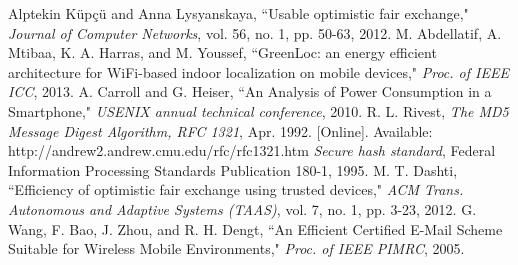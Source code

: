 \documentclass[journal,12pt, onecolumn]{IEEEtran}
\begin{document}
\begin{thebibliography}{31}
Alptekin K{\"u}p{\c{c}}{\"u} and Anna Lysyanskaya, ``Usable optimistic fair exchange," \textit{Journal of Computer Networks}, vol. 56, no. 1, pp. 50-63, 2012.
M. Abdellatif, A. Mtibaa, K. A. Harras, and M. Youssef, ``GreenLoc: an energy efficient architecture for WiFi-based indoor localization on mobile devices," \textit{Proc. of IEEE ICC}, 2013.
A. Carroll and G. Heiser, ``An Analysis of Power Consumption in a Smartphone," \textit{USENIX annual technical conference}, 2010.
R. L. Rivest, \textit{The MD5 Message Digest Algorithm, RFC 1321}, Apr. 1992. [Online]. Available: http://andrew2.andrew.cmu.edu/rfc/rfc1321.htm
\textit{Secure hash standard}, Federal Information Processing Standards Publication 180-1, 1995.
M. T. Dashti, ``Efficiency of optimistic fair exchange using trusted devices," \textit{ACM Trans. Autonomous and Adaptive Systems (TAAS)}, vol. 7, no. 1, pp. 3-23, 2012.
G. Wang, F. Bao, J. Zhou, and R. H. Dengt, ``An Efficient Certified E-Mail Scheme Suitable for Wireless Mobile Environments," \textit{Proc. of IEEE PIMRC}, 2005.


\end{thebibliography}






\newpage
\appendices
\end{document}
